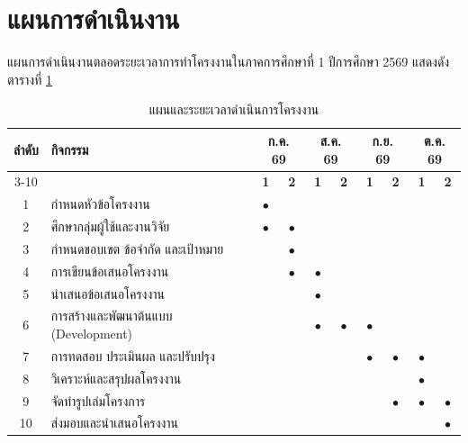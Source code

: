 \section{แผนการดำเนินงาน}

แผนการดำเนินงานตลอดระยะเวลาการทำโครงงานในภาคการศึกษาที่ 1 ปีการศึกษา 2569 แสดงดังตารางที่ \ref{tab:gantt}

\begin{table}[H]
\centering
\caption{แผนและระยะเวลาดำเนินการโครงงาน}
\label{tab:gantt}
\begin{tabular}{|c|l|c|c|c|c|c|c|c|c|}
\hline
\textbf{ลำดับ} & \textbf{กิจกรรม} & \multicolumn{2}{c|}{\textbf{ก.ค. 69}} & \multicolumn{2}{c|}{\textbf{ส.ค. 69}} & \multicolumn{2}{c|}{\textbf{ก.ย. 69}} & \multicolumn{2}{c|}{\textbf{ต.ค. 69}} \\ \cline{3-10}
 & & \textbf{1} & \textbf{2} & \textbf{1} & \textbf{2} & \textbf{1} & \textbf{2} & \textbf{1} & \textbf{2} \\ \hline
1 & กำหนดหัวข้อโครงงาน & $\bullet$ & & & & & & & \\ \hline
2 & ศึกษากลุ่มผู้ใช้และงานวิจัย & $\bullet$ & $\bullet$ & & & & & & \\ \hline
3 & กำหนดขอบเขต ข้อจำกัด และเป้าหมาย & & $\bullet$ & & & & & & \\ \hline
4 & การเขียนข้อเสนอโครงงาน & & $\bullet$ & $\bullet$ & & & & & \\ \hline
5 & นำเสนอข้อเสนอโครงงาน & & & $\bullet$ & & & & & \\ \hline
6 & การสร้างและพัฒนาต้นแบบ (Development) & & & $\bullet$ & $\bullet$ & $\bullet$ & & & \\ \hline
7 & การทดสอบ ประเมินผล และปรับปรุง & & & & & $\bullet$ & $\bullet$ & $\bullet$ & \\ \hline
8 & วิเคราะห์และสรุปผลโครงงาน & & & & & & & $\bullet$ & \\ \hline
9 & จัดทำรูปเล่มโครงการ & & & & & & $\bullet$ & $\bullet$ & $\bullet$ \\ \hline
10 & ส่งมอบและนำเสนอโครงงาน & & & & & & & & $\bullet$ \\ \hline
\end{tabular}
\end{table}
